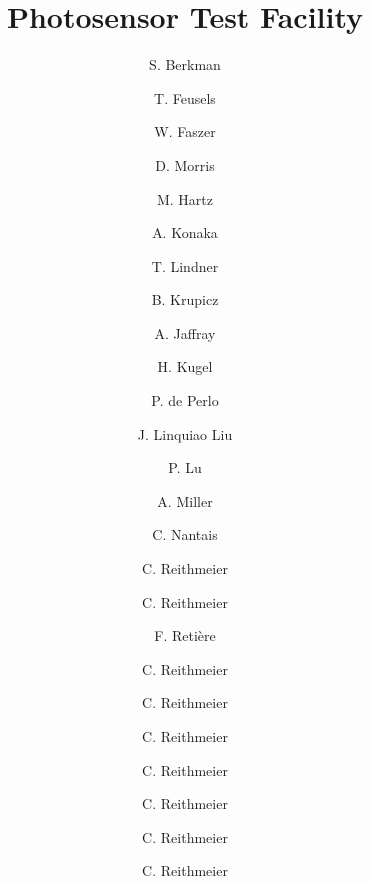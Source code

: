 \begin{frontmatter}


\title{Photosensor Test Facility}


\author[ins:ubc,ins:triu]{S. Berkman}
\author[ins:ubc,ins:triu]{T. Feusels}
\cortext[cor1]{}
\author[ins:triu]{W. Faszer}
\author[ins:triu]{D. Morris}
\author[ins:triu,ins:kav]{M. Hartz}
\author[ins:triu]{A. Konaka}
\author[ins:triu]{T. Lindner}
\author[]{B. Krupicz}
\author[]{A. Jaffray}
\author[]{H. Kugel}
\author[]{P. de Perlo}
\author[]{J. Linquiao Liu}
\author[]{P. Lu}
\author[]{A. Miller}
\author[]{C. Nantais}
\author[]{C. Reithmeier}
\author[]{C. Reithmeier}
\author[]{F. Reti\`ere}
\author[]{C. Reithmeier}
\author[]{C. Reithmeier}
\author[]{C. Reithmeier}
\author[]{C. Reithmeier}
\author[]{C. Reithmeier}
\author[]{C. Reithmeier}
\author[]{C. Reithmeier}



\address[ins:ubc]{University of British Columbia, Department of Physics and Astronomy, Vancouver, British Columbia, Canada}
\address[ins:triu]{TRIUMF, Vancouver, British Columbia, Canada}
\address[ins:kav]{Kavli Institute for the Physics and Mathematics of the Universe (WPI), The University
of Tokyo Institutes for Advanced Study, University of Tokyo, Kashiwa, Chiba, Japan}






\end{frontmatter}
